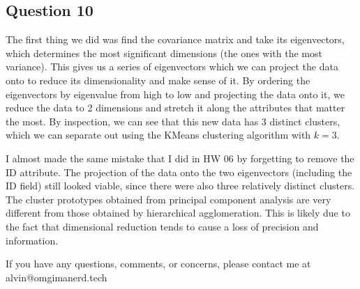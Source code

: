 \documentclass{math}
\begin{document}
\subsection*{Question 10}
The first thing we did was find the covariance matrix and take its eigenvectors,
which determines the most significant dimensions (the ones with the most
variance). This gives us a series of eigenvectors which we can project the data
onto to reduce its dimensionality and make sense of it. By ordering the
eigenvectors by eigenvalue from high to low and projecting the data onto it, we
reduce the data to 2 dimensions and stretch it along the attributes that matter
the most. By inspection, we can see that this new data has 3 distinct clusters,
which we can separate out using the KMeans clustering algorithm with
\( k = 3 \). \par
I almost made the same mistake that I did in HW 06 by forgetting to remove the
ID attribute. The projection of the data onto the two eigenvectors (including
the ID field) still looked viable, since there were also three relatively
distinct clusters. The cluster prototypes obtained from principal component
analysis are very different from those obtained by hierarchical agglomeration.
This is likely due to the fact that dimensional reduction tends to cause a loss
of precision and information.

\begin{center}
  If you have any questions, comments, or concerns, please contact me at
  alvin@omgimanerd.tech
\end{center}
\end{document}
